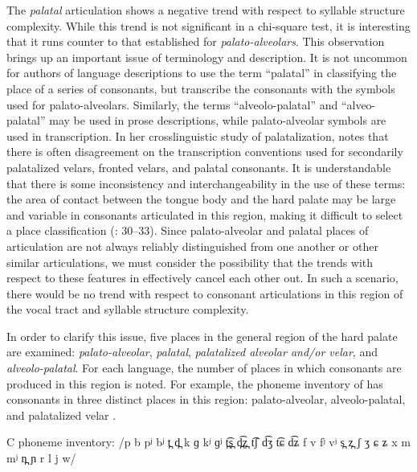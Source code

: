  The \textit{palatal} articulation shows a negative trend with respect to syllable structure complexity. While this trend is not significant in a chi-square test, it is interesting that it runs counter to that established for \textit{palato-alveolars}. This observation brings up an important issue of terminology and description. It is not uncommon for authors of language descriptions to use the term ``palatal'' in classifying the place of a series of consonants, but transcribe the consonants with the symbols used for palato-alveolars. Similarly, the terms ``alveolo-palatal'' and ``alveo-palatal'' may be used in prose descriptions, while palato-alveolar symbols are used in transcription. In her crosslinguistic study of palatalization, \citet{Bateman2007} notes that there is often disagreement on the transcription conventions used for secondarily palatalized velars, fronted velars, and palatal consonants. It is understandable that there is some inconsistency and interchangeability in the use of these terms: the area of contact between the tongue body and the hard palate may be large and variable in consonants articulated in this region, making it difficult to select a place classification (\citealt{LadefogedMaddieson1996}: 30--33). Since palato-alveolar and palatal places of articulation are not always reliably distinguished from one another or other similar articulations, we must consider the possibility that the trends with respect to these features in  effectively cancel each other out. In such a scenario, there would be no trend with respect to consonant articulations in this region of the vocal tract and syllable structure complexity.

  In order to clarify this issue, five places in the general region of the hard palate are examined: \textit{palato-alveolar}, \textit{palatal}, \textit{palatalized alveolar and/or velar}, and \textit{alveolo-palatal}. For each language, the number of places in which consonants are produced in this region is noted. For example, the phoneme inventory of  has consonants in three distinct places in this region: palato-alveolar, alveolo-palatal, and palatalized velar .

\ea\label{ex:4.32}
\begin{Coding}
\item[C phoneme inventory:] /p b pʲ bʲ t̪ d̪ k ɡ kʲ ɡʲ t̪͡s̪ d̪͡z̪ t͡ʃ d͡ʒ t͡ɕ d͡ʑ f v fʲ vʲ s̪ z̪ ʃ ʒ ɕ ʑ x m mʲ n̪ ɲ r l j w/
\end{Coding}
\z

